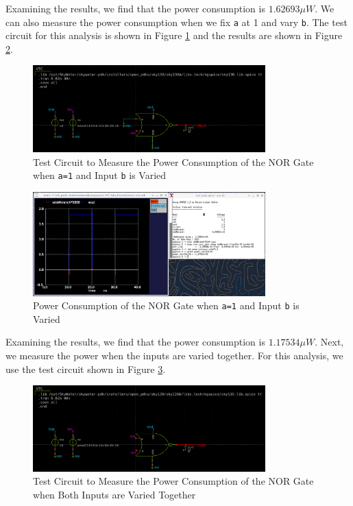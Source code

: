 \documentclass[fleqn]{article}
\begin{document}
	Examining the results, we find that the power consumption is $1.62693{\mu}W$. We can also measure the power consumption when we fix \texttt{a} at 1 and vary \texttt{b}. The test circuit for this analysis is shown in Figure \ref{fig::nor_power_test_sweep_vb} and the results are shown in Figure \ref{fig::nor_power_sweep_vb}.
	
	\begin{figure}[H]
		\centerline{\includegraphics[width=0.8\textwidth]{nor_power_test_sweep_vb.png}}
		\caption{Test Circuit to Measure the Power Consumption of the NOR Gate when \texttt{a=1} and Input \texttt{b} is Varied}
		\label{fig::nor_power_test_sweep_vb}
	\end{figure}
	
	\begin{figure}[H]
		\centerline{\includegraphics[width=0.8\textwidth]{nor_power_sweep_vb.png}}
		\caption{Power Consumption of the NOR Gate when \texttt{a=1} and Input \texttt{b} is Varied}
		\label{fig::nor_power_sweep_vb}
	\end{figure}
	
	Examining the results, we find that the power consumption is $1.17534{\mu}W$. Next, we measure the power when the inputs are varied together. For this analysis, we use the test circuit shown in Figure \ref{fig::nor_power_test_sweep_va_vb}.
	
	\begin{figure}[H]
		\centerline{\includegraphics[width=0.8\textwidth]{nor_power_test_sweep_va_vb.png}}
		\caption{Test Circuit to Measure the Power Consumption of the NOR Gate when Both Inputs are Varied Together}
		\label{fig::nor_power_test_sweep_va_vb}
	\end{figure}
	
\end{document}
